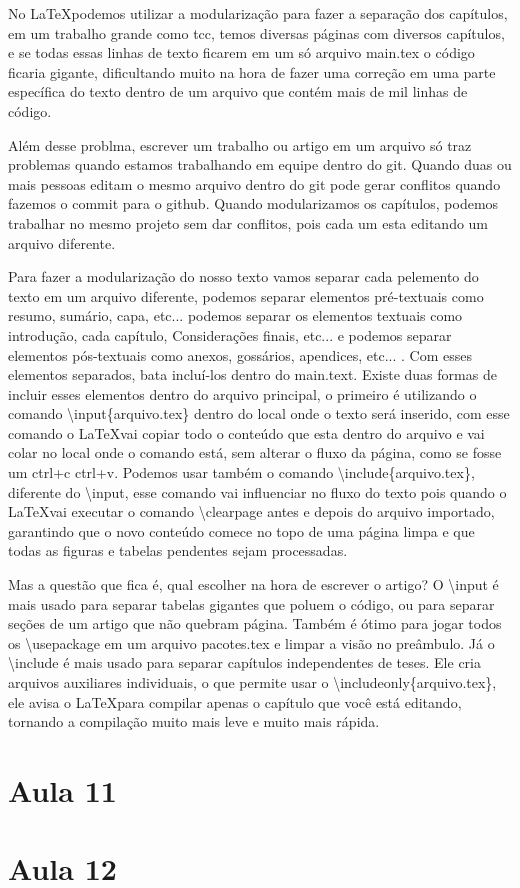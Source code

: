 No \LaTeX podemos utilizar a modularização para fazer a separação dos capítulos, em um trabalho grande como tcc, temos diversas páginas com diversos capítulos, e se todas essas linhas de texto ficarem em um só arquivo main.tex o código ficaria gigante, dificultando muito na hora de fazer uma correção em uma parte específica do texto dentro de um arquivo que contém mais de mil linhas de código.

Além desse problma, escrever um trabalho ou artigo em um arquivo só traz problemas quando estamos trabalhando em equipe dentro do git. Quando duas ou mais pessoas editam o mesmo arquivo dentro do git pode gerar conflitos quando fazemos o commit para o github. Quando modularizamos os capítulos, podemos trabalhar no mesmo projeto sem dar conflitos, pois cada um esta editando um arquivo diferente.

Para fazer a modularização do nosso texto vamos separar cada pelemento do texto em um arquivo diferente, podemos separar elementos pré-textuais como resumo, sumário, capa, etc... podemos separar os elementos textuais como introdução, cada capítulo, Considerações finais, etc... e podemos separar elementos pós-textuais como anexos, gossários, apendices, etc... . Com esses elementos separados, bata incluí-los dentro do main.text. Existe duas formas de incluir esses elementos dentro do arquivo principal, o primeiro é utilizando o comando \textbackslash input\{arquivo.tex\} dentro do local onde o texto será inserido, com esse comando o \LaTeX vai copiar todo o conteúdo que esta dentro do arquivo e vai colar no local onde o comando está, sem alterar o fluxo da página, como se fosse um ctrl+c ctrl+v. Podemos usar também o comando \textbackslash include\{arquivo.tex\}, diferente do \textbackslash input, esse comando vai influenciar no fluxo do texto pois quando o \LaTeX vai executar o comando \textbackslash clearpage antes e depois do arquivo importado, garantindo que o novo conteúdo comece no topo de uma página limpa e que todas as figuras e tabelas pendentes sejam processadas.

Mas a questão que fica é, qual escolher na hora de escrever o artigo? O \textbackslash input é mais usado para separar tabelas gigantes que poluem o código, ou para separar seções de um artigo que não quebram página. Também é ótimo para jogar todos os \textbackslash usepackage em um arquivo pacotes.tex e limpar a visão no preâmbulo. Já o \textbackslash include é mais usado para separar capítulos independentes de teses. Ele cria arquivos auxiliares individuais, o que permite usar o \textbackslash includeonly\{arquivo.tex\}, ele avisa o \LaTeX para compilar apenas o capítulo que você está editando, tornando a compilação muito mais leve e muito mais rápida. 






\section{Aula 11}
\lipsum[1-3]
\section{Aula 12}
\lipsum[1-3]


